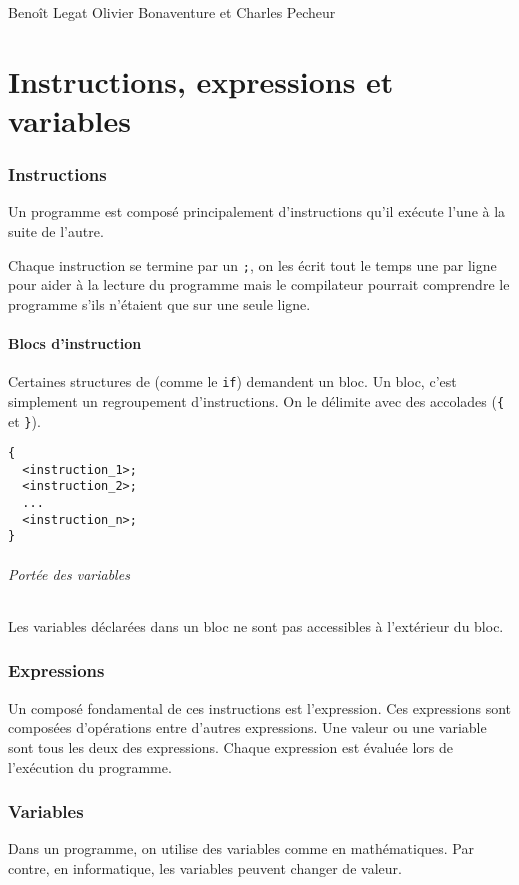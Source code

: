 

{Beno\^it Legat}
{Olivier Bonaventure et Charles Pecheur}


\part{Instructions, expressions et variables}

\section{Instructions}
Un programme est composé principalement d'instructions qu'il exécute l'une à la
suite de l'autre.

Chaque instruction se termine par un \lstinline|;|, on les écrit tout le temps
une par ligne pour aider à la lecture du programme mais le compilateur
pourrait comprendre le programme s'ils n'étaient que sur une seule ligne.

\subsection{Blocs d'instruction}
Certaines structures de \java{} (comme le \lstinline|if|) demandent un bloc.
Un bloc, c'est simplement un regroupement d'instructions.
On le délimite avec des accolades
(\lstinline|{| et \lstinline|}|).
\begin{lstlisting}
{
  <instruction_1>;
  <instruction_2>;
  ...
  <instruction_n>;
}
\end{lstlisting}

\paragraph{Portée des variables}
Les variables déclarées dans un bloc ne sont pas accessibles à l'extérieur
du bloc.

\section{Expressions}
Un composé fondamental de ces instructions est l'expression.
Ces expressions sont composées d'opérations entre d'autres expressions.
Une valeur ou une variable sont tous les deux des expressions.
Chaque expression est évaluée lors de l'exécution du programme.

\section{Variables}
Dans un programme, on utilise des variables comme en mathématiques.
Par contre, en informatique, les variables peuvent changer de valeur.

